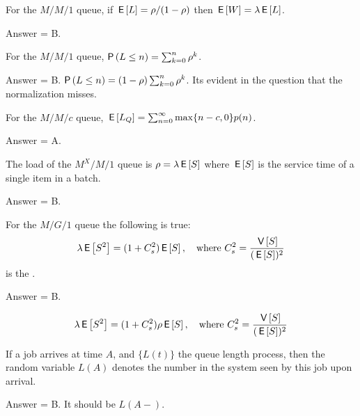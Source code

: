 \begin{exercise}[201803]
For the $M/M/1$ queue, if $\,\mathsf{E}\left[L\right] = \rho/(1-\rho)$ then $\,\mathsf{E}\left[W\right] = \lambda \,\mathsf{E}\left[L\right]$.
\begin{solution}
Answer = B.
\end{solution}
\end{exercise}

\begin{exercise}[201803]
For the $M/M/1$ queue, $\P{L\leq n} = \sum_{k=0}^n \rho^k$.
\begin{solution}
Answer = B. $\P{L\leq n} = (1-\rho)\sum_{k=0}^n \rho^k$. Its evident in the question that the normalization misses.
\end{solution}
\end{exercise}

\begin{exercise}[201803]
For the $M/M/c$ queue, $\,\mathsf{E}\left[L_Q\right] = \sum_{n=0}^\infty \max\{n-c, 0\} p(n)$. 
\begin{solution}
Answer = A.
\end{solution}
\end{exercise}

\begin{exercise}[201803]
The load of the $M^X/M/1$ queue is $\rho = \lambda \,\mathsf{E}\left[S\right]$ where $\,\mathsf{E}\left[S\right]$ is the service time of a single item in a batch.
\begin{solution}
Answer = B.
\end{solution}
\end{exercise}

\begin{exercise}[201803]
For the $M/G/1$ queue the following is true:
\begin{equation}
  \lambda \,\mathsf{E}\left[S^2\right] = (1+C_s^2)\,\mathsf{E}\left[S\right], \quad\text{where } C_s^2 = \frac{\,\mathsf{V}\left[S\right] }{(\,\mathsf{E}\left[S\right])^2}
\end{equation}
is the .
\begin{solution}
Answer = B.

\begin{equation}
  \lambda \,\mathsf{E}\left[S^2\right] = (1+C_s^2)\rho\,\mathsf{E}\left[S\right], \quad\text{where }
 C_s^2 = \frac{\,\mathsf{V}\left[S\right] }{(\,\mathsf{E}\left[S\right])^2}
\end{equation}
\end{solution}
\end{exercise}

\begin{exercise}[201803]
If a job arrives at time $A$, and $\{L(t)\}$ the queue length process, then the random variable $L(A)$   denotes the number in the system seen by this job upon arrival.
\begin{solution}
Answer = B. It should be $L(A-)$.
\end{solution}
\end{exercise}

